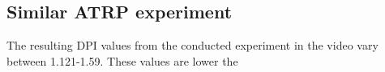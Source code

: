 \subsection{Similar ATRP experiment}

    The resulting DPI values from the conducted experiment in the video vary between 1.121-1.59. 
    These values are lower the 
